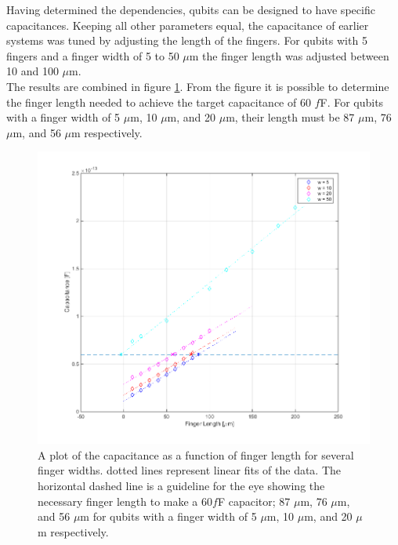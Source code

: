 Having determined the dependencies, qubits can be designed to have specific capacitances. Keeping all other parameters equal, the capacitance of earlier systems was tuned by adjusting the length of the fingers. For qubits with 5 fingers and a finger width of 5 to 50 \(\mu\)m the finger length was adjusted between 10 and 100 \(\mu\)m. \\
The results are combined in figure \ref{fig:Capacitances_g5_50}. From the figure it is possible to determine the finger length needed to achieve the target capacitance of 60 \(f\)F. For qubits with a finger width of  5 \(\mu\)m, 10 \(\mu\)m, and 20 \(\mu\)m, their length must be 87 \(\mu\)m, 76 \(\mu\)m, and 56 \(\mu\)m  respectively.   

\begin{figure}
	\centering
	\includegraphics[width = \textwidth]{Figures/Capacitances_g5_50}
	\caption{A plot of the capacitance as a function of finger length for several finger widths. dotted lines represent linear fits of the data. The horizontal dashed line is a guideline for the eye showing the necessary finger length to make a 60\(f\)F capacitor; 87 \(\mu\)m, 76 \(\mu\)m, and 56 \(\mu\)m for qubits with a finger width of  5 \(\mu\)m, 10 \(\mu\)m, and 20 \(\mu\)m respectively.}
	\label{fig:Capacitances_g5_50}
\end{figure} 

\clearpage

